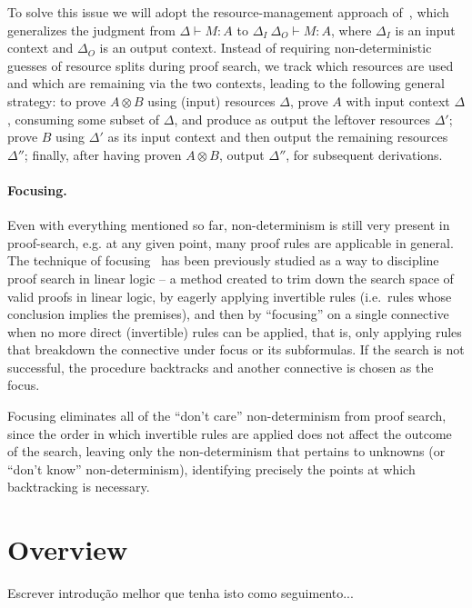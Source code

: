 \documentclass{llncs}
\newcommand{\tensor}{\otimes}
\newcommand{\mypara}[1]{\paragraph{\textbf{#1}.}}
\begin{document}
To solve this issue we will adopt the resource-management
approach
of~\cite{DBLP:journals/tcs/CervesatoHP00,DBLP:conf/lics/LiangM09},
which generalizes the judgment  from $\Delta \vdash M : A$ to
$\Delta_I \ \Delta_O \vdash M : A$, where $\Delta_I$ is an input
context and $\Delta_O$ is an output context.
Instead of requiring non-deterministic guesses of resource splits
during proof search, we track which resources are used and which are
remaining via the two contexts, leading to the following general strategy: to
prove $A\tensor B$ using (input) resources $\Delta$, prove $A$ with
input context $\Delta$,
consuming some subset of $\Delta$, and produce as output the leftover
resources $\Delta'$; prove $B$ using $\Delta'$ as its input context and then output the
remaining resources $\Delta''$; finally, after having proven
$A\tensor B$, output $\Delta''$, for subsequent derivations.


\mypara{Focusing}\label{sec:background_focusing}

Even with everything mentioned so far, non-determinism is still very
present in proof-search, e.g. at any given point, many proof
rules are applicable in general. The technique of focusing~\cite{10.1093/logcom/2.3.297,DBLP:conf/cade/ChaudhuriP05}
has been previously studied as a way to discipline proof search in
linear logic -- a method created to trim down the search space of
valid proofs in linear logic, by eagerly applying invertible rules
(i.e.~rules whose conclusion implies the premises), and then by
``focusing'' on a single connective when no more direct (invertible)
rules can be applied, that is, only applying rules that breakdown
the connective under focus or its subformulas. If the search is not
successful, the procedure backtracks and another connective is
chosen as the focus.

Focusing eliminates all of the ``don't care'' non-determinism from
proof search, since the order in which invertible rules are applied
does not affect the outcome of the search, leaving only the
non-determinism that pertains to unknowns (or ``don't know''
non-determinism), identifying precisely the points at which
backtracking is necessary.


\section{Overview}

Escrever introdução melhor que tenha isto como seguimento...
\end{document}
